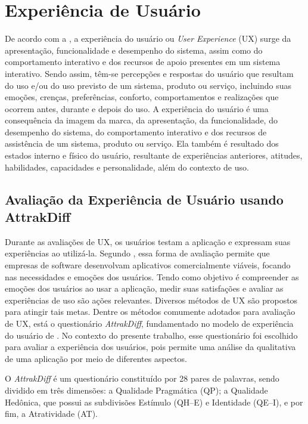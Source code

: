 \section{Experiência de Usuário} \label{expusua}

De acordo com a , a experiência do usuário ou \textit{User Experience} (UX) surge da apresentação, funcionalidade e desempenho do sistema, assim como do comportamento interativo e dos recursos de apoio presentes em um sistema interativo. Sendo assim, têm-se percepções e respostas do usuário que resultam do uso e/ou do uso previsto de um sistema, produto ou serviço, incluindo suas emoções, crenças, preferências, conforto, comportamentos e realizações que ocorrem antes, durante e depois do uso. A experiência do usuário é uma consequência da imagem da marca, da apresentação, da funcionalidade, do desempenho do sistema, do comportamento interativo e dos recursos de assistência de um sistema, produto ou serviço. Ela também é resultado dos estados interno e físico do usuário, resultante de experiências anteriores, atitudes, habilidades, capacidades e personalidade, além do contexto de uso.

\subsection{Avaliação da Experiência de Usuário usando AttrakDiff} \label{adiff}

Durante as avaliações de UX, os usuários testam a aplicação e expressam suas experiências ao utilizá-la. Segundo , essa forma de avaliação permite que empresas de software desenvolvam aplicativos comercialmente viáveis, focando nas necessidades e emoções dos usuários. Tendo como objetivo é compreender as emoções dos usuários ao usar a aplicação, medir suas satisfações e avaliar as experiências de uso são ações relevantes. Diversos métodos de UX são propostos para atingir tais metas. Dentre os métodos comumente adotados para avaliação de UX, está o questionário \textit{AttrakDiff}, fundamentado no modelo de experiência do usuário de . No contexto do presente trabalho, esse questionário foi escolhido para avaliar a experiência dos usuários, pois permite uma análise da qualitativa de uma aplicação por meio de diferentes aspectos.

O \textit{AttrakDiff} é um questionário constituído por 28 pares de palavras, sendo dividido em três dimensões: a Qualidade Pragmática (QP); a Qualidade Hedônica, que possui as subdivisões Estímulo (QH–E) e Identidade (QE–I), e por fim, a  Atratividade (AT).

